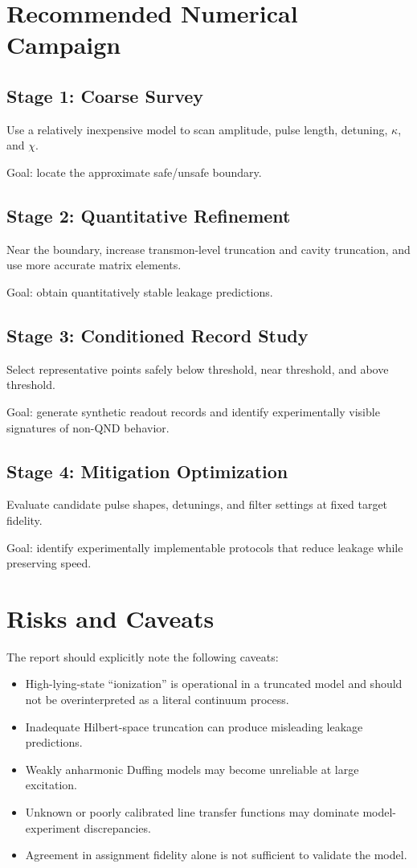 \documentclass[11pt]{article}
\begin{document}
\section{Recommended Numerical Campaign}

\subsection{Stage 1: Coarse Survey}
Use a relatively inexpensive model to scan amplitude, pulse length, detuning, $\kappa$, and
$\chi$.

Goal: locate the approximate safe/unsafe boundary.

\subsection{Stage 2: Quantitative Refinement}
Near the boundary, increase transmon-level truncation and cavity truncation, and use more
accurate matrix elements.

Goal: obtain quantitatively stable leakage predictions.

\subsection{Stage 3: Conditioned Record Study}
Select representative points safely below threshold, near threshold, and above threshold.

Goal: generate synthetic readout records and identify experimentally visible signatures of
non-QND behavior.

\subsection{Stage 4: Mitigation Optimization}
Evaluate candidate pulse shapes, detunings, and filter settings at fixed target fidelity.

Goal: identify experimentally implementable protocols that reduce leakage while preserving
speed.

\section{Risks and Caveats}

The report should explicitly note the following caveats:
\begin{itemize}[leftmargin=2em]
    \item High-lying-state ``ionization'' is operational in a truncated model and should
    not be overinterpreted as a literal continuum process.
    \item Inadequate Hilbert-space truncation can produce misleading leakage predictions.
    \item Weakly anharmonic Duffing models may become unreliable at large excitation.
    \item Unknown or poorly calibrated line transfer functions may dominate model-experiment
    discrepancies.
    \item Agreement in assignment fidelity alone is not sufficient to validate the model.
\end{itemize}
\end{document}
